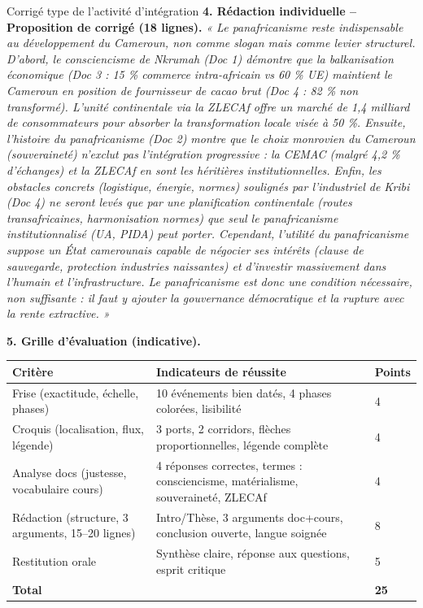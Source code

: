 \documentclass[11pt]{article}
\begin{document}
\begin{exoresolu}{Corrigé type de l'activité d'intégration}
\textbf{4. Rédaction individuelle – Proposition de corrigé (18 lignes).}
\textit{« Le panafricanisme reste indispensable au développement du Cameroun, non comme slogan mais comme levier structurel. D'abord, le consciencisme de Nkrumah (Doc 1) démontre que la balkanisation économique (Doc 3 : 15 \% commerce intra-africain vs 60 \% UE) maintient le Cameroun en position de fournisseur de cacao brut (Doc 4 : 82 \% non transformé). L'unité continentale via la ZLECAf offre un marché de 1,4 milliard de consommateurs pour absorber la transformation locale visée à 50 \%. Ensuite, l'histoire du panafricanisme (Doc 2) montre que le choix monrovien du Cameroun (souveraineté) n'exclut pas l'intégration progressive : la CEMAC (malgré 4,2 \% d'échanges) et la ZLECAf en sont les héritières institutionnelles. Enfin, les obstacles concrets (logistique, énergie, normes) soulignés par l'industriel de Kribi (Doc 4) ne seront levés que par une planification continentale (routes transafricaines, harmonisation normes) que seul le panafricanisme institutionnalisé (UA, PIDA) peut porter. Cependant, l'utilité du panafricanisme suppose un État camerounais capable de négocier ses intérêts (clause de sauvegarde, protection industries naissantes) et d'investir massivement dans l'humain et l'infrastructure. Le panafricanisme est donc une condition nécessaire, non suffisante : il faut y ajouter la gouvernance démocratique et la rupture avec la rente extractive. »}

\textbf{5. Grille d'évaluation (indicative).}
\begin{center}
\begin{tabularx}{\linewidth}{|l|X|X|}\hline
\rowcolor{popblueL}
\textbf{Critère} & \textbf{Indicateurs de réussite} & \textbf{Points} \\ \hline
Frise (exactitude, échelle, phases) & 10 événements bien datés, 4 phases colorées, lisibilité & 4 \\ \hline
Croquis (localisation, flux, légende) & 3 ports, 2 corridors, flèches proportionnelles, légende complète & 4 \\ \hline
Analyse docs (justesse, vocabulaire cours) & 4 réponses correctes, termes : consciencisme, matérialisme, souveraineté, ZLECAf & 4 \\ \hline
Rédaction (structure, 3 arguments, 15--20 lignes) & Intro/Thèse, 3 arguments doc+cours, conclusion ouverte, langue soignée & 8 \\ \hline
Restitution orale & Synthèse claire, réponse aux questions, esprit critique & 5 \\ \hline
\textbf{Total} & & \textbf{25} \\ \hline
\end{tabularx}
\end{center}
\end{exoresolu}
\end{document}
